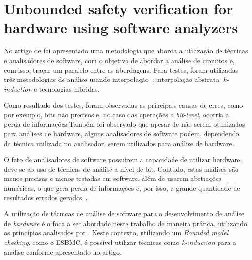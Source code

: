 \section{Unbounded safety verification for hardware using software analyzers}
No artigo de  foi apresentado uma metodologia que aborda a utilização de técnicas e analisadores de software, com o objetivo de abordar a análise de circuitos e, com isso, traçar um paralelo entre as abordagens. Para testes, foram utilizadas três metodologias de análise usando interpolação~\cite{beyer2011cpachecker}: interpolação abstrata\cite{blanchet2003static}, \textit{k-induction}\cite{donaldson2011software} e tecnologias híbridas. 

\par
Como resultado dos testes, foram observadas as principais causas de erros, como por exemplo, bits não precisos e, no caso das operações a \textit{bit-level}, ocorria a perda de informações.Também foi observado que apesar de não serem otimizados para análises de hardware, alguns analisadores de software podem, dependendo da técnica utilizada no analisador, serem utilizados para análise de hardware\cite{mukherjee2016unbounded}.

\par
O fato de analisadores de software possuírem a capacidade de utilizar hardware, deve-se ao uso de técnicas de análise a nível de bit. Contudo, estas análises são menos precisas e menos testadas em software, além de usarem abstrações numéricas, o que gera perda de informações e, por isso, a grande quantidade de resultados errados gerados~\cite{mukherjee2016unbounded}.

\par
A utilização de técnicas de análise de software para o desenvolvimento de análise de \textit{hardware} é o foco a ser abordado neste trabalho de maneira prática, utilizando os princípios analisados por \cite{mukherjee2016unbounded}. Neste contexto, utilizando um \textit{Bounded model checking}, como o ESBMC, é possível utilizar técnicas como \textit{k-induction} para a análise conforme apresentado no artigo.

